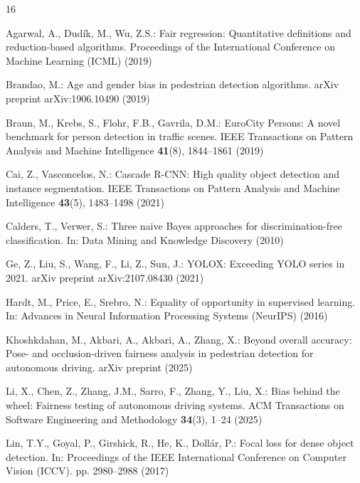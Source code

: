 \documentclass[runningheads]{llncs}
\begin{document}
\begin{thebibliography}{16}
\small
\setlength{\itemsep}{0.08em}
\setlength{\parsep}{0pt}
\setlength{\parskip}{0pt}

Agarwal, A., Dud{\'i}k, M., Wu, Z.S.: Fair regression: Quantitative definitions
  and reduction-based algorithms. Proceedings of the International Conference
  on Machine Learning (ICML) (2019)

Brandao, M.: Age and gender bias in pedestrian detection algorithms. arXiv
  preprint arXiv:1906.10490 (2019)

Braun, M., Krebs, S., Flohr, F.B., Gavrila, D.M.: {EuroCity Persons}: A novel
  benchmark for person detection in traffic scenes. IEEE Transactions on
  Pattern Analysis and Machine Intelligence \textbf{41}(8), 1844--1861 (2019)

Cai, Z., Vasconcelos, N.: Cascade {R-CNN}: High quality object detection and
  instance segmentation. IEEE Transactions on Pattern Analysis and Machine
  Intelligence \textbf{43}(5), 1483--1498 (2021)

Calders, T., Verwer, S.: Three naive {Bayes} approaches for discrimination-free
  classification. In: Data Mining and Knowledge Discovery (2010)

Ge, Z., Liu, S., Wang, F., Li, Z., Sun, J.: {YOLOX}: Exceeding {YOLO} series in
  2021. arXiv preprint arXiv:2107.08430 (2021)

Hardt, M., Price, E., Srebro, N.: Equality of opportunity in supervised
  learning. In: Advances in Neural Information Processing Systems (NeurIPS)
  (2016)

Khoshkdahan, M., Akbari, A., Akbari, A., Zhang, X.: Beyond overall accuracy:
  Pose- and occlusion-driven fairness analysis in pedestrian detection for
  autonomous driving. arXiv preprint (2025)

Li, X., Chen, Z., Zhang, J.M., Sarro, F., Zhang, Y., Liu, X.: Bias behind the
  wheel: Fairness testing of autonomous driving systems. ACM Transactions on
  Software Engineering and Methodology \textbf{34}(3), 1--24 (2025)

Lin, T.Y., Goyal, P., Girshick, R., He, K., Doll{\'a}r, P.: Focal loss for
  dense object detection. In: Proceedings of the IEEE International Conference
  on Computer Vision (ICCV). pp. 2980--2988 (2017)


\end{thebibliography}
\end{document}
